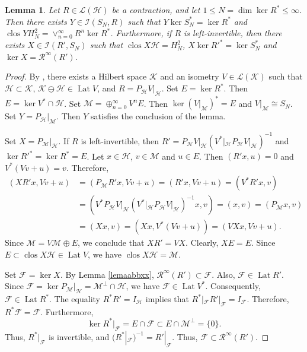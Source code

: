 \documentclass[a4paper,oneside,11pt]{amsart}
\numberwithin{equation}{section}
\theoremstyle{plain}
\newtheorem{lemma}[theorem]{Lemma}
\theoremstyle{definition}
\begin{document}
\begin{lemma}\label{lemmodel}
 Let $R\in\mathcal L(\mathcal H)$ be a contraction, 
 and let $1\leq N=\dim\ker R^*\leq \infty$. 
Then there exists $Y\in\mathcal I(S_N,R)$ such that  $Y\ker S_N^*=\ker R^*$ and 
$\operatorname{clos}Y H^2_N=\vee_{n=0}^\infty R^n\ker R^*$. Furthermore, if $R$ is left-invertible, then 
there exists $X\in\mathcal I(R',S_N)$ such that  $\operatorname{clos}X\mathcal H=H^2_N$, $X\ker R'^*=\ker S_N^*$ and 
$\ker X=\mathcal R^\infty(R')$. 
\end{lemma}
\begin{proof} By {\cite[Theorem I.4.1]{nfbk}}, there exists a Hilbert space $\mathcal K$ and an
 isometry $V\in\mathcal L(\mathcal K)$ such that $\mathcal H\subset\mathcal K$, 
$\mathcal K\ominus\mathcal H\in\operatorname{Lat}V$, and $R=P_{\mathcal H}V|_{\mathcal H}$. 
Set $E=\ker R^*$. Then $E=\ker V^*\cap\mathcal H$. 
Set   $\mathcal M=\oplus_{n=0}^\infty V^n E$. Then $\ker (V|_{\mathcal M})^*=E$ and $V|_{\mathcal M}\cong S_N$.
Set $Y=P_{\mathcal H}|_{\mathcal M}$. Then $Y$ satisfies the conclusion of the lemma.

Set $X=P_{\mathcal M}|_{\mathcal H}$. If $R$ is left-invertible,
 then $R'=P_{\mathcal H}V|_{\mathcal H}(V^*|_{\mathcal H}P_{\mathcal H}V|_{\mathcal H})^{-1}$ and 
$\ker R'^*=\ker R^*=E$. Let $x\in\mathcal H$, $v\in\mathcal M$ and $u\in E$. 
Then $(R'x,u)=0$ and $V^*(Vv+u)=v$. Therefore,
\begin{align*} (XR'x, Vv+u)&=(P_{\mathcal M}R'x,Vv+u)=(R'x,Vv+u)=(V^*R'x,v)\\&=
(V^*P_{\mathcal H}V|_{\mathcal H}(V^*|_{\mathcal H}P_{\mathcal H}V|_{\mathcal H})^{-1}x,v)=(x,v)=
(P_{\mathcal M}x,v)\\&=(Xx,v)=(Xx, V^*(Vv+u))=(VXx, Vv+u).\end{align*}
Since $\mathcal M=V\mathcal M\oplus E$, we conclude that $XR'=VX$. Clearly, $XE=E$. Since 
$E\subset\operatorname{clos}X\mathcal H\in\operatorname{Lat}V$, we have 
$\operatorname{clos}X\mathcal H=\mathcal M$. 

Set $\mathcal F=\ker X$. By Lemma \ref{lemaabbxx}, $\mathcal R^\infty(R')\subset \mathcal F$. Also, $\mathcal F\in\operatorname{Lat}R'$. 
Since $\mathcal F=\ker P_{\mathcal M}|_{\mathcal H}=\mathcal M^\perp\cap\mathcal H$, we have 
$\mathcal F\in\operatorname{Lat}V^*$. Consequently,  $\mathcal F\in\operatorname{Lat}R^*$. 
The equality $R^*R'=I_{\mathcal H}$ implies that $R^*|_{\mathcal F}R'|_{\mathcal F}=I_{\mathcal F}$. Therefore, 
 $R^*\mathcal F=\mathcal F$. Furthermore, 
\begin{equation*}
\ker R^*|_{\mathcal F}=E\cap\mathcal F\subset E\cap\mathcal M^\perp=\{0\}.
\end{equation*}
Thus, $R^*|_{\mathcal F}$ is invertible, and $(R^*|_{\mathcal F})^{-1}=R'|_{\mathcal F}$. Thus,  
$\mathcal F\subset\mathcal R^\infty(R')$. 
\end{proof}
\end{document}
